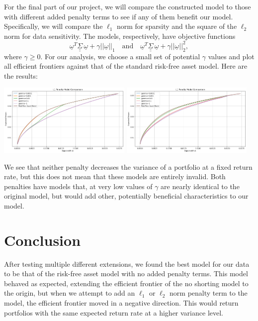 \documentclass{article}
\renewcommand{\vec}[1]{\underline{#1}}
\newcommand{\mat}[1]{\underline{\underline{#1}}}
\theoremstyle{definition}
\begin{document}
For the final part of our project, we will compare the constructed model to those with different added penalty terms to see if any of them benefit our model. Specifically, we will compare the $\ell_1$ norm for sparsity and the square of the $\ell_2$ norm for data sensitivity. The models, respectively, have objective functions 
$$\vec\omega^T \mat\Sigma \, \vec\omega + \gamma||\vec\omega||_1 \quad \text{and} \quad \vec\omega^T \mat\Sigma \, \vec\omega + \gamma||\vec\omega||_2^2,$$
where $\gamma \geq 0$. For our analysis, we choose a small set of potential $\gamma$ values and plot all efficient frontiers against that of the standard risk-free asset model. Here are the results:
\begin{center}
	\includegraphics[width=0.48\textwidth]{L1.png}
	\includegraphics[width=0.48\textwidth]{L2.png}
\end{center}
We see that neither penalty decreases the variance of a portfolio at a fixed return rate, but this does not mean that these models are entirely invalid. Both penalties have models that, at very low values of $\gamma$ are nearly identical to the original model, but would add other, potentially beneficial characteristics to our model. 


\section{Conclusion}

After testing multiple different extensions, we found the best model for our data to be that of the risk-free asset model with no added penalty terms. This model behaved as expected, extending the efficient frontier of the no shorting model to the origin, but when we attempt to add an $\ell_1$ or $\ell_2$ norm penalty term to the model, the efficient frontier moved in a negative direction. This would return portfolios with the same expected return rate at a higher variance level. 
\end{document}

